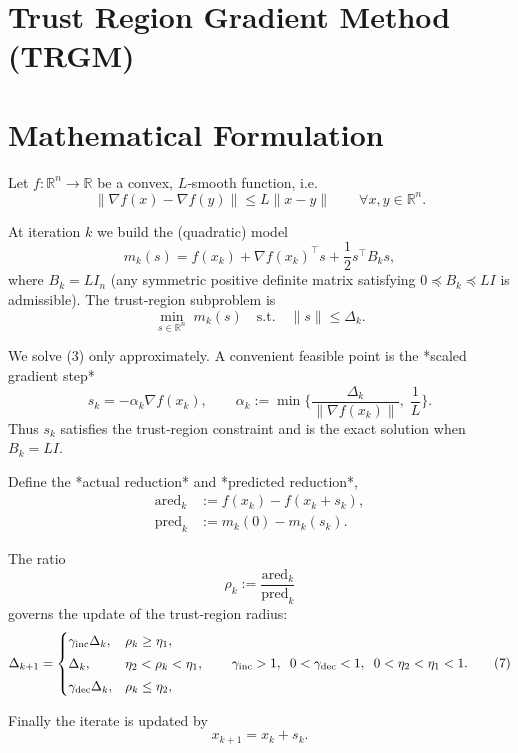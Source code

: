 \documentclass{article}
\begin{document}
\section*{Trust Region Gradient Method (TRGM)}

\section*{Mathematical Formulation}
Let $f:\mathbb{R}^n\to\mathbb{R}$ be a convex, $L$‑smooth function, i.e.  
\[
\|\nabla f(x)-\nabla f(y)\|\le L\|x-y\|\qquad\forall x,y\in\mathbb{R}^n .
\tag{1}
\]

At iteration $k$ we build the (quadratic) model
\[
m_k(s)=f(x_k)+\nabla f(x_k)^{\top}s+\frac{1}{2}s^{\top}B_k s ,
\tag{2}
\]
where $B_k=L I_n$ (any symmetric positive definite matrix satisfying $0\preceq B_k\preceq L I$ is admissible).  
The trust‑region subproblem is
\[
\min_{s\in\mathbb{R}^n}\; m_k(s)\quad\text{s.t.}\quad \|s\|\le\Delta_k .
\tag{3}
\]

We solve (3) only approximately. A convenient feasible point is the *scaled gradient step*
\[
s_k = -\alpha_k \nabla f(x_k),\qquad 
\alpha_k:=\min\!\Big\{\frac{\Delta_k}{\|\nabla f(x_k)\|},\;\frac{1}{L}\Big\}.
\tag{4}
\]
Thus $s_k$ satisfies the trust‑region constraint and is the exact solution when $B_k=L I$.

Define the *actual reduction* and *predicted reduction*,
\[
\begin{aligned}
\text{ared}_k &:= f(x_k)-f(x_k+s_k),\\[2mm]
\text{pred}_k &:= m_k(0)-m_k(s_k).
\end{aligned}
\tag{5}
\]

The ratio
\[
\rho_k:=\frac{\text{ared}_k}{\text{pred}_k}
\tag{6}
\]
governs the update of the trust‑region radius:
\[
\Delta_{k+1}= 
\begin{cases}
\gamma_{\rm inc}\Delta_k , & \rho_k\ge\eta_1,\\[1mm]
\Delta_k , & \eta_2<\rho_k<\eta_1,\\[1mm]
\gamma_{\rm dec}\Delta_k , & \rho_k\le\eta_2,
\end{cases}
\qquad
\gamma_{\rm inc}>1,\;\;0<\gamma_{\rm dec}<1,\;\;0<\eta_2<\eta_1<1 .
\tag{7}
\]

Finally the iterate is updated by
\[
x_{k+1}=x_k+s_k .
\tag{8}
\]
\end{document}
